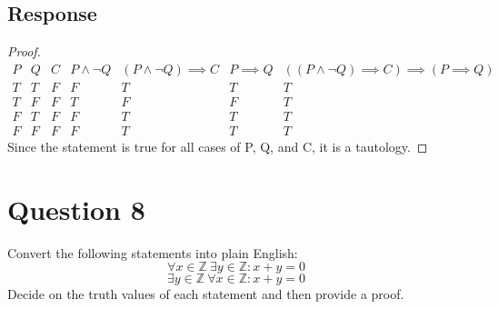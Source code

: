 \documentclass[13pt]{article}
\begin{document}
\subsection*{Response}
\begin{proof}
  \[
    \begin{array}{c|c|c|c|c|c|c}
      P & Q & C & P \land \neg Q & (P \land \neg Q) \implies C & P \implies Q & ((P \land \neg Q) \implies C)
                                                                                \implies (P \implies Q) \\
      \hline
      T & T & F & F & T & T & T \\
      T & F & F & T & F & F & T \\
      F & T & F & F & T & T & T \\
      F & F & F & F & T & T & T 
    \end{array}
  \]
  Since the statement is true for all cases of P, Q, and C, it is a tautology.
\end{proof}





\newpage
\section*{Question 8}
Convert the following statements into plain English:
\[\forall x \in \mathbb{Z} \ \exists y \in \mathbb{Z} : x + y = 0\]
\[\exists y \in \mathbb{Z} \ \forall x \in \mathbb{Z} : x + y = 0\]
Decide on the truth values of each statement and then provide a proof.
\end{document}
